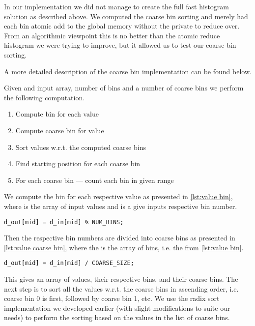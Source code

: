 In our implementation we did not manage to create the full fast histogram solution as described above.
We computed the coarse bin sorting and merely had each bin atomic add to the global memory without the private  to reduce over.
From an algorithmic viewpoint this is no better than the atomic reduce histogram we were trying to improve, but it allowed us to test our coarse bin sorting.


A more detailed description of the coarse bin implementation can be found below.

Given and input array, number of bins  and a number of coarse bins  we perform the following computation.
%
\begin{enumerate}
  \item Compute bin for each value
  \item Compute coarse bin for value
  \item Sort values w.r.t. the computed coarse bins
  \item Find starting position for each coarse bin
  \item For each coarse bin --- count each bin in given range
\end{enumerate}
%
We compute the bin for each respective value as presented in \cref{lst:value bin}, where  is the array of input values and  is a give inputs respective bin number.

\begin{lstlisting}[caption={compute each value's bin}, label={lst:value bin}, numbers=none]
d_out[mid] = d_in[mid] % NUM_BINS;
\end{lstlisting}

Then the respective bin numbers are divided into coarse bins as presented in \cref{lst:value coarse bin}, where the  is the array of bins, i.e. the  from \cref{lst:value bin}.

\begin{lstlisting}[caption={compute each value's coarse bin}, label={lst:value coarse bin}, numbers=none]
d_out[mid] = d_in[mid] / COARSE_SIZE;
\end{lstlisting}

This gives an array of values, their respective bins, and their coarse bins.
The next step is to sort all the values w.r.t. the coarse bins in ascending order, i.e. coarse bin 0 is first, followed by coarse bin 1, etc.
We use the radix sort implementation we developed earlier (with slight modifications to suite our needs) to perform the sorting based on the values in the list of coarse bins.

